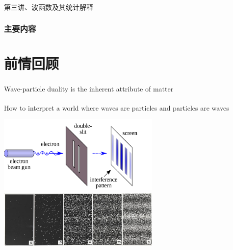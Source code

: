 \begin{frame} [plain]
    \frametitle{}
    \Background[1] 
    \begin{center}
    { {\huge 第三讲、波函数及其统计解释}}
    \end{center}  
    \addtocounter{framenumber}{-1}   
\end{frame}

\begin{frame}
        \frametitle{主要内容}
        \transfade
        \tableofcontents
        \addtocounter{framenumber}{-1} 
\end{frame}

\section{前情回顾}

\begin{frame}
    \frametitle{}
    \begin{tcolorbox4}[前情回顾]
        Wave-particle duality is the inherent attribute of matter\\
        ~~\\
        How to interpret a world where waves are particles and particles are waves
    \end{tcolorbox4}
\end{frame}

\begin{frame}
    \begin{center}
        \includegraphics[width=0.6\textwidth]{figs/Etwoslitexp.png} \\
        \includegraphics[width=0.6\textwidth]{figs/two-slit.png} \\
    \end{center} 
\end{frame}

